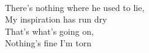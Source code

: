 \\
There's nothing where he used to lie, \\
My inspiration has run dry \\
That's what's going on, \\
Nothing's fine I'm torn \\
\\
